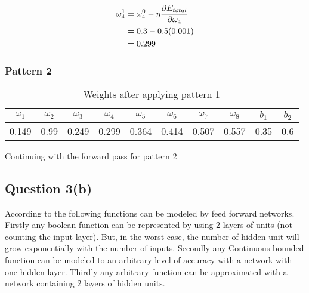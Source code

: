 \documentclass[10pt,a4paper]{article}
\begin{document}
\begin{equation}
\begin{split}
\omega_4^1 &= \omega_4^0 - \eta\pdv{E_{total}}{\omega_4}\\
           &= 0.3 -0.5(0.001)\\
           &= 0.299\\
\end{split}
\end{equation}

\subsubsection{Pattern 2}
\begin{table}
\begin{tabular}{|c|c|c|c|c|c|c|c|c|c|}
\hline
$\omega_1$ & $\omega_2$ & $\omega_3$ & $\omega_4$ & $\omega_5$ & $\omega_6$ & $\omega_7$ & $\omega_8$ & $b_1$ & $b_2$\\
\hline
0.149 &0.99 &0.249 & 0.299 & 0.364 & 0.414 & 0.507 & 0.557 & 0.35 & 0.6 \\
\hline
\end{tabular}
\caption{Weights after applying pattern 1}\label{tablep2}
\end{table}

Continuing with the forward pass for pattern 2
























\subsection{Question 3(b)}

According to \cite{Michell2009} the following functions can be modeled by feed forward networks. Firstly any boolean function can be represented by using 2 layers of units (not counting the input layer). But, in the worst case, the number of hidden unit will grow exponentially with the number of inputs. Secondly any Continuous bounded function can be modeled to an arbitrary level of accuracy with a network with one hidden layer. Thirdly any arbitrary function can be approximated with a network containing 2 layers of hidden units.
 
\end{document}
